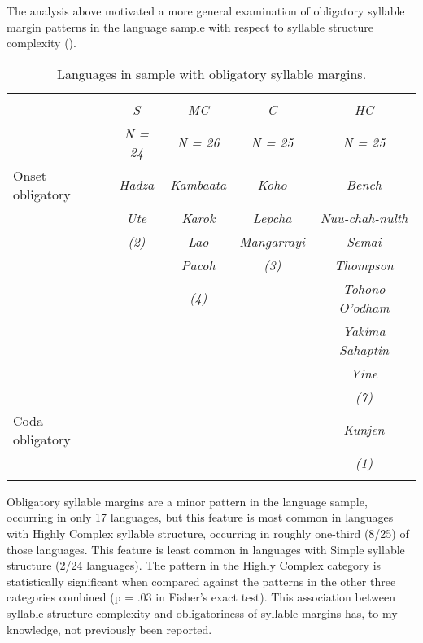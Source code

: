   The analysis above motivated a more general examination of obligatory syllable margin patterns in the language sample with respect to syllable structure complexity ().

\begin{table}
\begin{tabular}{l *{4}{>{\itshape}c}}
\lsptoprule
& \multicolumn{4}{c}{Syllable structure complexity}\\\cmidrule(lr){2-5}
& \normalfont S & \normalfont MC & \normalfont C & \normalfont HC\\
& \normalfont \textit{N} = 24 & \normalfont \textit{N} = 26 & \normalfont \textit{N} = 25 & \normalfont \textit{N} = 25\\\midrule
{Onset obligatory} & Hadza        & Kambaata   &  Koho   &  Bench   \\
                   & Ute          &    Karok           &      Lepcha       &      Nuu-chah-nulth\\
                   & \normalfont (2)          &       Lao          &      Mangarrayi   &           Semai\\
                   &              &    Pacoh           &    \normalfont(3)            &       Thompson\\
                   &              &   \normalfont (4)              &                   &       Tohono O’odham\\
                   &              &                    &                   &        Yakima Sahaptin\\
                   &              &                    &                   &         Yine\\
                   &              &                    &                   &         \normalfont(7)\\
{Coda obligatory}  & -- & -- & -- & Kunjen \\
                   &   &   &   & \normalfont (1)\\
\lspbottomrule
\end{tabular}
\caption{\label{tab:3.4}Languages in sample with obligatory syllable margins.}
\end{table}

  Obligatory syllable margins are a minor pattern in the language sample, occurring in only 17 languages, but this feature is most common in languages with Highly Complex syllable structure, occurring in roughly one-third (8/25) of those languages. This feature is least common in languages with Simple syllable structure (2/24 languages). The pattern in the Highly Complex category is statistically significant when compared against the patterns in the other three categories combined (p = .03 in Fisher’s exact test). This association between syllable structure complexity and obligatoriness of syllable margins has, to my knowledge, not previously been reported.

